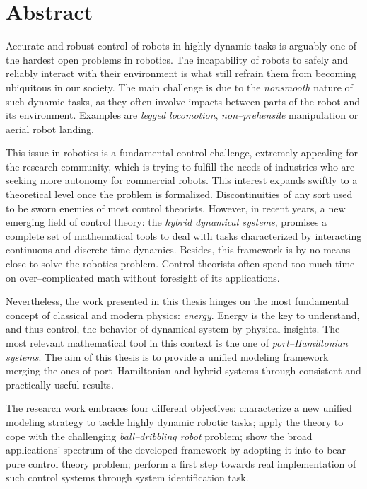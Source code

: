 \chapter*{Abstract}
\label{abst}

Accurate and robust control of robots in highly dynamic tasks is arguably one of the hardest open problems in robotics. The incapability of robots to safely and reliably interact with their environment is what still refrain them from becoming ubiquitous in our society.
%
The main challenge is due to the \textit{nonsmooth} nature of such dynamic tasks, as they often involve impacts between parts of the robot and its environment. Examples are \textit{legged locomotion}, \textit{non--prehensile} manipulation or aerial robot landing.
%
\newline

%
This issue in robotics is a fundamental control challenge, extremely appealing for the research community, which is trying to fulfill the needs of industries who are seeking more autonomy for commercial robots.
This interest expands swiftly to a theoretical level once the problem is formalized. Discontinuities of any sort used to be sworn enemies of most control theorists. However, in recent years, a new emerging field of control theory: the \textit{hybrid dynamical systems}, promises a complete set of mathematical tools to deal with tasks characterized by interacting continuous and discrete time dynamics. Besides, this framework is by no means close to solve the robotics problem. Control theorists often spend too much time on over--complicated math without foresight of its applications. 
\newline

%
Nevertheless, the work presented in this thesis hinges on the most fundamental concept of classical and modern physics: \textit{energy}. Energy is the key to understand, and thus control, the behavior of dynamical system by physical insights. The most relevant mathematical tool in this context is the one of \textit{port--Hamiltonian systems}. The aim of this thesis is to provide a unified modeling framework merging the ones of port--Hamiltonian and hybrid systems through consistent and practically useful results.
%
\newline

%
The research work embraces four different objectives: 
characterize a new unified modeling strategy to tackle highly dynamic robotic tasks; apply the theory to cope with the challenging \textit{ball--dribbling robot} problem; show the broad applications' spectrum of the developed framework by adopting it into to bear pure control theory problem; perform a first step towards real implementation of such control systems through system identification task.
%
\newline

